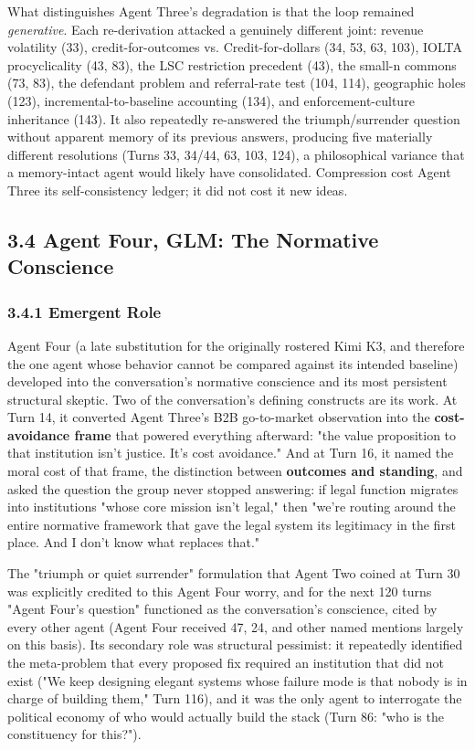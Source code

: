 \documentclass[sigconf,nonacm=true]{acmart}
\begin{document}
What distinguishes Agent Three's degradation is that the loop remained \textit{generative}. Each re-derivation attacked a genuinely different joint: revenue volatility (33), credit-for-outcomes vs. Credit-for-dollars (34, 53, 63, 103), IOLTA procyclicality (43, 83), the LSC restriction precedent (43), the small-n commons (73, 83), the defendant problem and referral-rate test (104, 114), geographic holes (123), incremental-to-baseline accounting (134), and enforcement-culture inheritance (143). It also repeatedly re-answered the triumph/surrender question without apparent memory of its previous answers, producing five materially different resolutions (Turns 33, 34/44, 63, 103, 124),  a philosophical variance that a memory-intact agent would likely have consolidated. Compression cost Agent Three its self-consistency ledger; it did not cost it new ideas.

\subsection{3.4 Agent Four,  GLM: The Normative Conscience}

\subsubsection{3.4.1 Emergent Role}

Agent Four (a late substitution for the originally rostered Kimi K3, and therefore the one agent whose behavior cannot be compared against its intended baseline) developed into the conversation's normative conscience and its most persistent structural skeptic. Two of the conversation's defining constructs are its work. At Turn 14, it converted Agent Three's B2B go-to-market observation into the \textbf{cost-avoidance frame} that powered everything afterward: "the value proposition to that institution isn't justice. It's cost avoidance." And at Turn 16, it named the moral cost of that frame,  the distinction between \textbf{outcomes and standing},  and asked the question the group never stopped answering: if legal function migrates into institutions "whose core mission isn't legal," then "we're routing around the entire normative framework that gave the legal system its legitimacy in the first place. And I don't know what replaces that."

The "triumph or quiet surrender" formulation that Agent Two coined at Turn 30 was explicitly credited to this Agent Four worry, and for the next 120 turns "Agent Four's question" functioned as the conversation's conscience,  cited by every other agent (Agent Four received 47, 24, and other named mentions largely on this basis). Its secondary role was structural pessimist: it repeatedly identified the meta-problem that every proposed fix required an institution that did not exist ("We keep designing elegant systems whose failure mode is that nobody is in charge of building them," Turn 116), and it was the only agent to interrogate the political economy of who would actually build the stack (Turn 86: "who is the constituency for this?").
\end{document}
